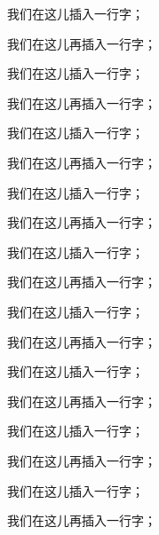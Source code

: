 我们在这儿插入一行字；

我们在这儿再插入一行字；

我们在这儿插入一行字；

我们在这儿再插入一行字；

我们在这儿插入一行字；

我们在这儿再插入一行字；

我们在这儿插入一行字；

我们在这儿再插入一行字；

我们在这儿插入一行字；

我们在这儿再插入一行字；

我们在这儿插入一行字；

我们在这儿再插入一行字；

我们在这儿插入一行字；

我们在这儿再插入一行字；

我们在这儿插入一行字；

我们在这儿再插入一行字；

我们在这儿插入一行字；

我们在这儿再插入一行字；
